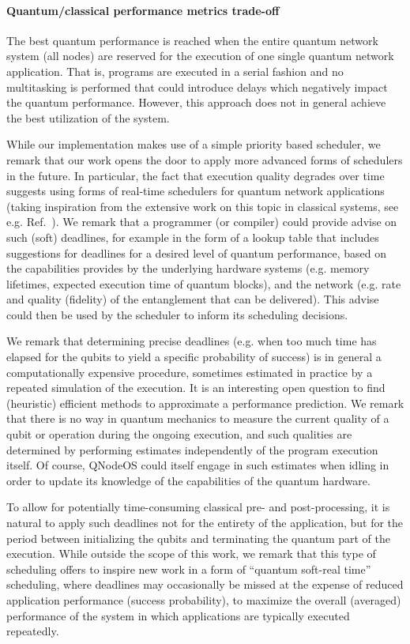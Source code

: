 \paragraph{Quantum/classical performance metrics trade-off}

The best quantum performance is reached when the entire quantum network system (all nodes) are reserved for the execution of one single quantum network application. That is, programs are executed in a serial fashion and no multitasking is performed that could introduce delays which negatively impact the quantum performance. However, this approach does not in general achieve the best utilization of the system. 

While our implementation makes use of a simple priority based scheduler, we remark that our work opens the door to apply more advanced forms of schedulers in the future. In particular, the fact that execution quality degrades over time suggests using forms of real-time schedulers for quantum network applications (taking inspiration from the extensive work on this topic in classical systems, see e.g. Ref.~\cite{liu_1973_scheduling}).  We remark that a programmer (or compiler) could provide advise on such (soft) deadlines, for example in the form of a lookup table that includes suggestions for deadlines for a desired level of quantum performance, based on the capabilities provides by the underlying hardware systems (e.g. memory lifetimes, expected execution time of quantum blocks), and the network (e.g. rate and quality (fidelity) of the entanglement that can be delivered). This advise could then be used by the scheduler to inform its scheduling decisions.

We remark that determining precise deadlines (e.g. when too much time has elapsed for the qubits to yield a specific probability of success) is in general a computationally expensive procedure, sometimes estimated in practice by a repeated simulation of the execution. It is an interesting open question to find (heuristic) efficient methods to approximate a performance prediction. We remark that there is no way in quantum mechanics to measure the current quality of a qubit or operation during the ongoing execution, and such qualities are determined by performing estimates independently of the program execution itself. Of course, \ac{QNodeOS} could itself engage in such estimates when idling in order to update its knowledge of the capabilities of the quantum hardware.

To allow for potentially time-consuming classical pre- and post-processing, it is natural to apply such deadlines not for the entirety of the application, but for the period between initializing the qubits and terminating the quantum part of the execution. While outside the scope of this work, we remark that this type of scheduling offers to inspire new work in a form of ``quantum soft-real time'' scheduling, where deadlines may occasionally be missed at the expense of reduced application performance (success probability), to maximize the overall (averaged) performance of the system in which
applications are typically executed repeatedly. 


